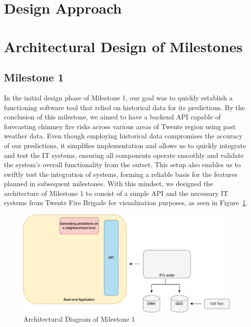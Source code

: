 \documentclass{utitcphd_overleaf}
\begin{document}
\section{Design Approach}

\section{Architectural Design of Milestones}

\subsection{Milestone 1}

In the initial design phase of Milestone 1, our goal was to quickly establish a functioning software tool that relied on historical data for its predictions. By the conclusion of this milestone, we aimed to have a backend API capable of forecasting chimney fire risks across various areas of Twente region using past weather data. Even though employing historical data compromises the accuracy of our predictions, it simplifies implementation and allows us to quickly integrate and test the IT systems, ensuring all components operate smoothly and validate the system's overall functionality from the outset. This setup also enables us to swiftly test the integration of systems, forming a reliable basis for the features planned in subsequent milestones. With this mindset, we designed the architecture of Milestone 1 to consist of a simple API and the necessary IT systems from Twente Fire Brigade for visualization purposes, as seen in Figure~\ref{fig:iteration_1_arch}.

\begin{figure}[ht]
  \centering
  \includegraphics[width=1\textwidth]{my_images/milestones/iteration_1_arch.png}
  \caption{Architectural Diagram of Milestone 1}
  \label{fig:iteration_1_arch}
\end{figure}
\end{document}
